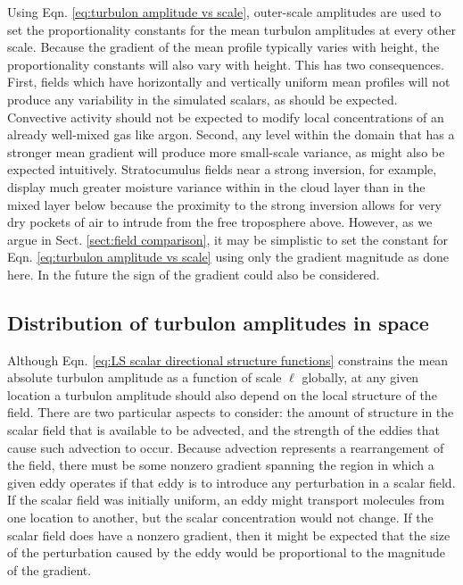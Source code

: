 \documentclass[acp, manuscript, english]{copernicus}
\begin{document}
Using Eqn. \ref{eq:turbulon amplitude vs scale}, outer-scale amplitudes are used to set the proportionality constants for the mean turbulon amplitudes at every other scale. Because the gradient of the mean profile typically varies with height, the proportionality constants will also vary with height. This has two consequences. First, fields which have horizontally and vertically uniform mean profiles will not produce any variability in the simulated scalars, as should be expected. Convective activity should not be expected to modify local concentrations of an already well-mixed gas like argon. Second, any level within the domain that has a stronger mean gradient will produce more small-scale variance, as might also be expected intuitively. Stratocumulus fields near a strong inversion, for example, display much greater moisture variance within in the cloud layer than in the mixed layer below because the proximity to the strong inversion allows for very dry pockets of air to intrude from the free troposphere above. However, as we argue in Sect. \ref{sect:field comparison}, it may be simplistic to set the constant for Eqn. \ref{eq:turbulon amplitude vs scale} using only the gradient magnitude as done here. In the future the sign of the gradient could also be considered.
 
\subsection{Distribution of turbulon amplitudes in space} \label{sect:distribution of turbulon amplitudes in space}

Although Eqn. \ref{eq:LS scalar directional structure functions} constrains the mean absolute turbulon amplitude as a function of scale $\ell$ globally, at any given location a turbulon amplitude should also depend on the local structure of the field. There are two particular aspects to consider: the amount of structure in the scalar field that is available to be advected, and the strength of the eddies that cause such advection to occur. Because advection represents a rearrangement of the field, there must be some nonzero gradient spanning the region in which a given eddy operates if that eddy is to introduce any perturbation in a scalar field. If the scalar field was initially uniform, an eddy might transport molecules from one location to another, but the scalar concentration would not change. If the scalar field does have a nonzero gradient, then it might be expected that the size of the perturbation caused by the eddy would be proportional to the magnitude of the gradient. 
\end{document}
